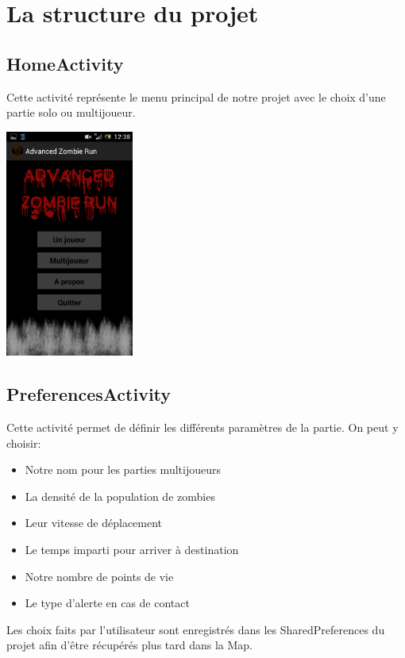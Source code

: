 \documentclass{article}
\begin{document}
\section{La structure du projet}


\subsection{HomeActivity}

Cette activité représente le menu principal de notre projet avec le choix d'une partie solo ou multijoueur.


\vfill
\begin{center} 
\includegraphics[width=4.2cm, height=7.cm]{menu.png}
\end{center}
\vfill


\subsection{PreferencesActivity}


Cette activité permet de définir les différents paramètres de la partie. On peut y choisir:
\begin{itemize}
\item Notre nom pour les parties multijoueurs
\item La densité de la population de zombies
\item Leur vitesse de déplacement
\item Le temps imparti pour arriver à destination
\item Notre nombre de points de vie
\item Le type d'alerte en cas de contact
\end{itemize}
Les choix faits par l'utilisateur sont enregistrés dans les SharedPreferences du projet afin d'être récupérés plus tard dans la Map.
\end{document}
